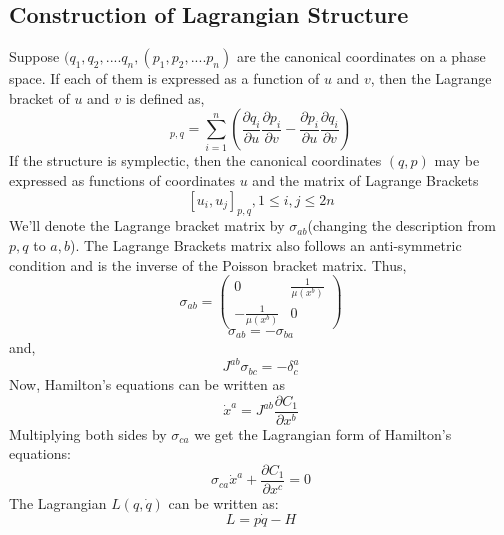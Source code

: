\documentclass[12pt]{article}
\begin{document}
\subsection*{Construction of Lagrangian Structure}
Suppose $(q_{1}, q_{2},....q_{n},(p_{1}, p_{2},....p_{n})$ are the canonical coordinates on a phase space. If each of them is expressed as a function of $u$ and $v$, then the Lagrange bracket of $u$ and $v$ is defined as,
\begin{equation}
[u, v]_{p, q}=\sum_{i=1}^{n}\left(\frac{\partial q_{i}}{\partial u} \frac{\partial p_{i}}{\partial v}-\frac{\partial p_{i}}{\partial u} \frac{\partial q_{i}}{\partial v}\right)
\end{equation}
If the structure is symplectic, then the canonical coordinates $(q,p)$ may be expressed as functions of coordinates $u$ and the matrix of Lagrange Brackets
\begin{equation}
\left[u_{i}, u_{j}\right]_{p, q}   , 1 \leq i, j \leq 2 n
\end{equation}
We'll denote the Lagrange bracket matrix by $\sigma_{a b}$(changing the description from $p,q$ to $a,b$). The Lagrange Brackets matrix also follows an anti-symmetric condition and is the inverse of the Poisson bracket matrix. Thus,
\begin{equation*}
\sigma_{a b}=\left( \begin{array}{cc}{0} & {\frac{1}{\mu\left(x^{b}\right)}} \\ {-\frac{1}{\mu\left(x^{b}\right)}} & {0}\end{array}\right)
\end{equation*}
\begin{equation*}
\sigma_{a b}=-\sigma_{b a}
\end{equation*}
and,
\begin{equation}
J^{a b} \sigma_{b c}=-\delta^{a}_{c}
\label{67}
\end{equation} 
Now, Hamilton's equations can be written as
\begin{equation}
\dot{x}^{a}=J^{a b} \frac{\partial C_{1}}{\partial x^{b}}
\label{68}
\end{equation}
Multiplying both sides by $\sigma_{c a}$ we get the Lagrangian form of Hamilton's equations:
\begin{equation}
\sigma_{c a} \dot{x}^{a}+\frac{\partial C_{1}}{\partial x^{c}}=0
\label{69}
\end{equation} 
The Lagrangian $L(q,\dot{q})$ can be written as:
\begin{equation}
L= p\dot{q} - H
\label{70}
\end{equation}
\end{document}
